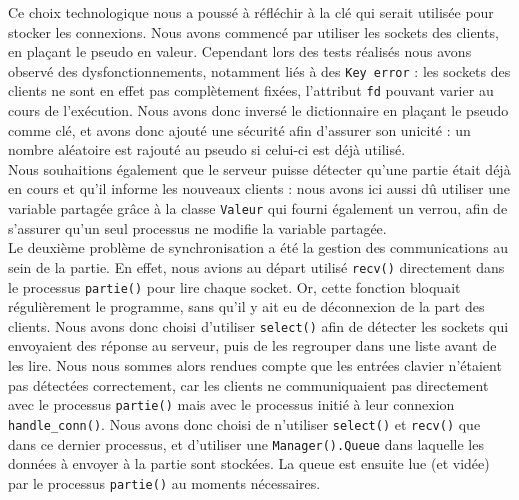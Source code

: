 \documentclass[12pt, a4paper]{article}
\begin{document}
Ce choix technologique nous a poussé à réfléchir à la clé qui serait utilisée pour stocker les connexions. Nous avons commencé par utiliser les sockets des clients, en plaçant le pseudo en valeur. Cependant lors des tests réalisés nous avons observé des dysfonctionnements, notamment liés à des \texttt{Key error} : les sockets des clients ne sont en effet pas complètement fixées, l'attribut \texttt{fd} pouvant varier au cours de l'exécution. Nous avons donc inversé le dictionnaire en plaçant le pseudo comme clé, et avons donc ajouté une sécurité afin d'assurer son unicité : un nombre aléatoire est rajouté au pseudo si celui-ci est déjà utilisé. \\
    
Nous souhaitions également que le serveur puisse détecter qu'une partie était déjà en cours et qu'il informe les nouveaux clients : nous avons ici aussi dû utiliser une variable partagée grâce à la classe \texttt{Valeur} qui fourni également un verrou, afin de s'assurer qu'un seul processus ne modifie la variable partagée.\\
    
Le deuxième problème de synchronisation a été la gestion des communications au sein de la partie. En effet, nous avions au départ utilisé \texttt{recv()} directement dans le processus \texttt{partie()} pour lire chaque socket. Or, cette fonction bloquait régulièrement le programme, sans qu'il y ait eu de déconnexion de la part des clients. Nous avons donc choisi d'utiliser \texttt{select()} afin de détecter les sockets qui envoyaient des réponse au serveur, puis de les regrouper dans une liste avant de les lire. Nous nous sommes alors rendues compte que les entrées clavier n'étaient pas détectées correctement, car les clients ne communiquaient pas directement avec le processus \texttt{partie()} mais avec le processus initié à leur connexion \texttt{handle\_conn()}. Nous avons donc choisi de n'utiliser \texttt{select()} et \texttt{recv()} que dans ce dernier processus, et d'utiliser une \texttt{Manager().Queue} dans laquelle les données à envoyer à la partie sont stockées. La queue est ensuite lue (et vidée) par le processus \texttt{partie()} au moments nécessaires.\\
    
\end{document}
